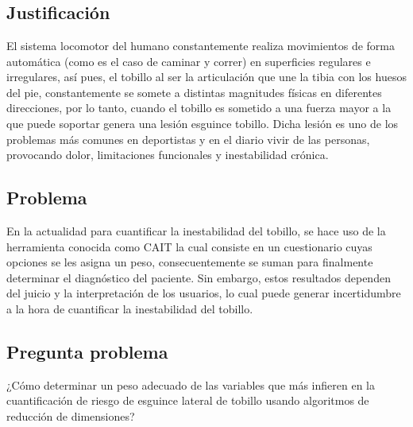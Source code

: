 \cleardoublepage %

\chapter{}

\section{Justificación}

El sistema locomotor del humano constantemente realiza movimientos de forma automática (como es el caso de caminar y correr) en superficies regulares e irregulares, así pues, el tobillo al ser la articulación que une la tibia con los huesos del pie, constantemente se somete a distintas magnitudes físicas en diferentes direcciones, por lo tanto, cuando el tobillo es sometido a una fuerza mayor a la que puede soportar genera una lesión esguince tobillo. Dicha lesión es uno de los problemas más comunes en deportistas y en el diario vivir de las personas, provocando dolor, limitaciones funcionales y inestabilidad crónica.

\section{Problema}

En la actualidad para cuantificar la inestabilidad del tobillo, se hace uso de la herramienta conocida como CAIT la cual consiste en un cuestionario cuyas opciones se les asigna un peso, consecuentemente se suman para finalmente determinar el diagnóstico del paciente. Sin embargo, estos resultados dependen del juicio y la interpretación de los usuarios, lo cual puede generar incertidumbre a la hora de cuantificar la inestabilidad del tobillo. 


\section{Pregunta problema}
¿Cómo determinar un peso adecuado de las variables que más infieren en la cuantificación de riesgo de esguince lateral de tobillo usando algoritmos de reducción de dimensiones?


